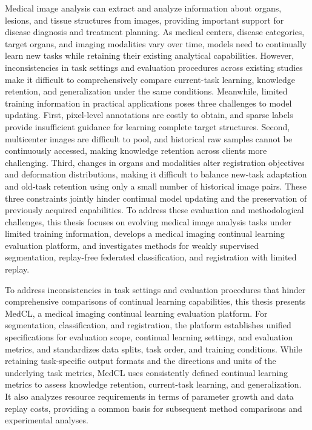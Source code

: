 Medical image analysis can extract and analyze information about organs, lesions, and tissue structures from images, providing important support for disease diagnosis and treatment planning. As medical centers, disease categories, target organs, and imaging modalities vary over time, models need to continually learn new tasks while retaining their existing analytical capabilities. However, inconsistencies in task settings and evaluation procedures across existing studies make it difficult to comprehensively compare current-task learning, knowledge retention, and generalization under the same conditions. Meanwhile, limited training information in practical applications poses three challenges to model updating. First, pixel-level annotations are costly to obtain, and sparse labels provide insufficient guidance for learning complete target structures. Second, multicenter images are difficult to pool, and historical raw samples cannot be continuously accessed, making knowledge retention across clients more challenging. Third, changes in organs and modalities alter registration objectives and deformation distributions, making it difficult to balance new-task adaptation and old-task retention using only a small number of historical image pairs. These three constraints jointly hinder continual model updating and the preservation of previously acquired capabilities. To address these evaluation and methodological challenges, this thesis focuses on evolving medical image analysis tasks under limited training information, develops a medical imaging continual learning evaluation platform, and investigates methods for weakly supervised segmentation, replay-free federated classification, and registration with limited replay.

To address inconsistencies in task settings and evaluation procedures that hinder comprehensive comparisons of continual learning capabilities, this thesis presents MedCL, a medical imaging continual learning evaluation platform. For segmentation, classification, and registration, the platform establishes unified specifications for evaluation scope, continual learning settings, and evaluation metrics, and standardizes data splits, task order, and training conditions. While retaining task-specific output formats and the directions and units of the underlying task metrics, MedCL uses consistently defined continual learning metrics to assess knowledge retention, current-task learning, and generalization. It also analyzes resource requirements in terms of parameter growth and data replay costs, providing a common basis for subsequent method comparisons and experimental analyses.

